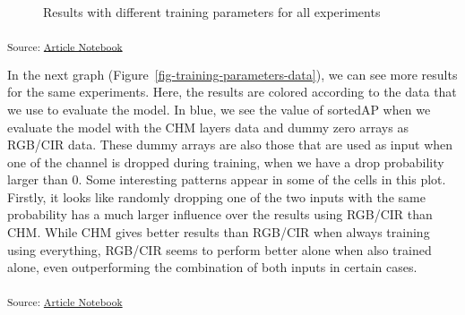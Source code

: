 \documentclass[
  letterpaper,
  DIV=11,
  numbers=noendperiod]{scrartcl}
\begin{document}
\begin{figure}[H]


\caption{\label{fig-training-parameters-experiments}Results with
different training parameters for all experiments}

\end{figure}%

\textsubscript{Source:
\href{https://ZokszY.github.io/Geodan-internship-report/index.qmd.html}{Article
Notebook}}

In the next graph (Figure~\ref{fig-training-parameters-data}), we can
see more results for the same experiments. Here, the results are colored
according to the data that we use to evaluate the model. In blue, we see
the value of sortedAP when we evaluate the model with the CHM layers
data and dummy zero arrays as RGB/CIR data. These dummy arrays are also
those that are used as input when one of the channel is dropped during
training, when we have a drop probability larger than 0. Some
interesting patterns appear in some of the cells in this plot. Firstly,
it looks like randomly dropping one of the two inputs with the same
probability has a much larger influence over the results using RGB/CIR
than CHM. While CHM gives better results than RGB/CIR when always
training using everything, RGB/CIR seems to perform better alone when
also trained alone, even outperforming the combination of both inputs in
certain cases.

\textsubscript{Source:
\href{https://ZokszY.github.io/Geodan-internship-report/index.qmd.html}{Article
Notebook}}
\end{document}
